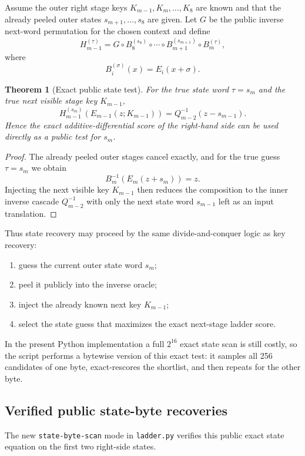 \documentclass[11pt]{article}
\newtheorem{theorem}{Theorem}
\begin{document}
Assume the outer right stage keys $K_{m-1},K_m,\dots,K_8$ are known and that the already peeled outer states $s_{m+1},\dots,s_8$ are given. Let $G$ be the public inverse next-word permutation for the chosen context and define
\[
H_{m-1}^{(\tau)} =
G\circ B_8^{(s_8)}\circ \cdots \circ B_{m+1}^{(s_{m+1})}\circ B_m^{(\tau)},
\]
where
\[
B_i^{(\sigma)}(x)=E_i(x+\sigma).
\]

\begin{theorem}[Exact public state test]
For the true state word $\tau=s_m$ and the true next visible stage key $K_{m-1}$,
\[
H_{m-1}^{(s_m)}(E_{m-1}(z;K_{m-1}))
=
Q_{m-2}^{-1}(z-s_{m-1}).
\]
Hence the exact additive-differential score of the right-hand side can be used directly as a public test for $s_m$.
\end{theorem}

\begin{proof}
The already peeled outer stages cancel exactly, and for the true guess $\tau=s_m$ we obtain
\[
B_m^{-1}(E_m(z+s_m))=z.
\]
Injecting the next visible key $K_{m-1}$ then reduces the composition to the inner inverse cascade $Q_{m-2}^{-1}$ with only the next state word $s_{m-1}$ left as an input translation.
\end{proof}

Thus state recovery may proceed by the same divide-and-conquer logic as key recovery:
\begin{enumerate}[label=(\roman*)]
\item guess the current outer state word $s_m$;
\item peel it publicly into the inverse oracle;
\item inject the already known next key $K_{m-1}$;
\item select the state guess that maximizes the exact next-stage ladder score.
\end{enumerate}

In the present Python implementation a full $2^{16}$ exact state scan is still costly, so the script performs a bytewise version of this exact test: it samples all 256 candidates of one byte, exact-rescores the shortlist, and then repeats for the other byte.

\subsection*{Verified public state-byte recoveries}
The new \texttt{state-byte-scan} mode in \texttt{ladder.py} verifies this public exact state equation on the first two right-side states.
\end{document}
